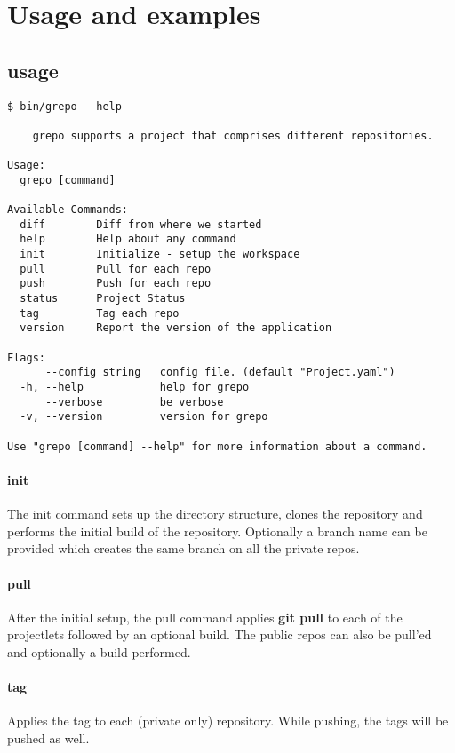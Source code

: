 \documentclass[11pt, a4paper]{article} %
\begin{document}
\section{Usage and examples}

\subsection{usage}

\begin{lstlisting}[caption=Basic usage]
$ bin/grepo --help

	grepo supports a project that comprises different repositories.

Usage:
  grepo [command]

Available Commands:
  diff        Diff from where we started
  help        Help about any command
  init        Initialize - setup the workspace
  pull        Pull for each repo
  push        Push for each repo
  status      Project Status
  tag         Tag each repo
  version     Report the version of the application

Flags:
      --config string   config file. (default "Project.yaml")
  -h, --help            help for grepo
      --verbose         be verbose
  -v, --version         version for grepo

Use "grepo [command] --help" for more information about a command.

\end{lstlisting}

\paragraph{init} The init command sets up the directory structure, clones the repository and performs the initial build of the repository. Optionally a branch name can be provided which creates the same branch on all the private repos.

\paragraph{pull} After the initial setup, the pull command applies \textbf{git pull} to each of the projectlets followed by an optional build. The public repos can also be pull'ed and optionally a build performed.

\paragraph{tag} Applies the tag to each (private only) repository. While pushing, the tags will be pushed as well.
\end{document}
